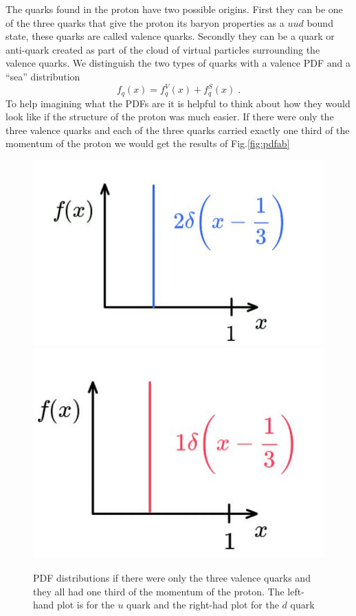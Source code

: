 \documentclass[12pt]{article}
\begin{document}
The quarks found in the proton have two possible origins. First they can be one of the three quarks that give the proton its baryon properties as a $uud$ bound state, these quarks are called valence quarks. Secondly they can be a quark or anti-quark created as part of the cloud of virtual particles surrounding the valence quarks. We distinguish the two types of quarks with a valence PDF and a ``sea'' distribution
\[f_q(x)=f_q^V(x)+f_q^S(x)\;.\]
To help imagining what the PDFs are it is helpful to think about how they would look like if the structure of the proton was much easier. If there were only the three valence quarks and each of the three quarks carried exactly one third of the momentum of the proton we would get the results of Fig.\ref{fig:pdfab}
\begin{figure}[h]
\begin{center}
	\includegraphics[scale=0.25]{images/PDFa.png}
    \includegraphics[scale=0.25]{images/PDFb.png}
\end{center}
  \caption{PDF distributions if there were only the three valence quarks and they all had one third of the momentum of the proton. The left-hand plot is for the $u$ quark and the right-had plot for the $d$ quark }
  \label{fig:pdf13}
  \end{figure}
\end{document}
